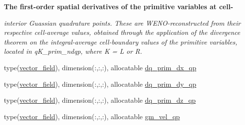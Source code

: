\begin{Indent}\textbf{ The first-\/order spatial derivatives of the primitive variables at cell-\/}\par
{\em interior Guassian quadrature points. These are W\+E\+N\+O-\/reconstructed from their respective cell-\/average values, obtained through the application of the divergence theorem on the integral-\/average cell-\/boundary values of the primitive variables, located in q\+K\+\_\+prim\+\_\+ndqp, where K = L or R. }\begin{DoxyCompactItemize}
\item 
type(\hyperlink{structm__derived__types_1_1vector__field}{vector\+\_\+field}), dimension(\+:,\+:,\+:), allocatable \hyperlink{namespacem__rhs_a48f3d69bb519043ca76fb10f8a2f44c0}{dq\+\_\+prim\+\_\+dx\+\_\+qp}
\item 
type(\hyperlink{structm__derived__types_1_1vector__field}{vector\+\_\+field}), dimension(\+:,\+:,\+:), allocatable \hyperlink{namespacem__rhs_aa727628a4ae8fa3af715f416b7bcadbe}{dq\+\_\+prim\+\_\+dy\+\_\+qp}
\item 
type(\hyperlink{structm__derived__types_1_1vector__field}{vector\+\_\+field}), dimension(\+:,\+:,\+:), allocatable \hyperlink{namespacem__rhs_a145666708445ab1fa66bb58fa248b0c1}{dq\+\_\+prim\+\_\+dz\+\_\+qp}
\item 
type(\hyperlink{structm__derived__types_1_1vector__field}{vector\+\_\+field}), dimension(\+:,\+:,\+:), allocatable \hyperlink{namespacem__rhs_ae49e4c2622ff0adf0b066da12e8256c8}{gm\+\_\+vel\+\_\+qp}
\end{DoxyCompactItemize}
\end{Indent}
